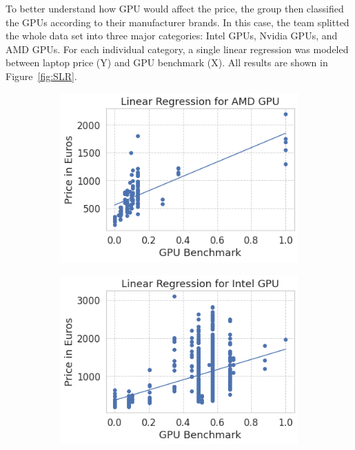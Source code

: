 \documentclass{scrartcl}
\begin{document}
To better understand how GPU would affect the price, the group then classified the GPUs according to their manufacturer brands. In this case, the team splitted the whole data set into three major categories: Intel GPUs, Nvidia GPUs, and AMD GPUs. For each individual category, a single linear regression was modeled between laptop price (Y) and GPU benchmark (X). All results are shown in Figure~\ref{fig:SLR}. 

\begin{figure}[H]
     \centering
     \begin{subfigure}
         \centering
         \includegraphics[scale=0.5]{Graphics/4520 final/AMD_GPU_LNR_0-1.png}
     \end{subfigure}
     \hfill
     \begin{subfigure}
         \centering
         \includegraphics[scale=0.5]{Graphics/4520 final/Intel_GPU_LNR_0-1.png}
     \end{subfigure}
     \hfill
     \begin{subfigure}
         \centering

\end{subfigure}
\end{figure}
\end{document}
